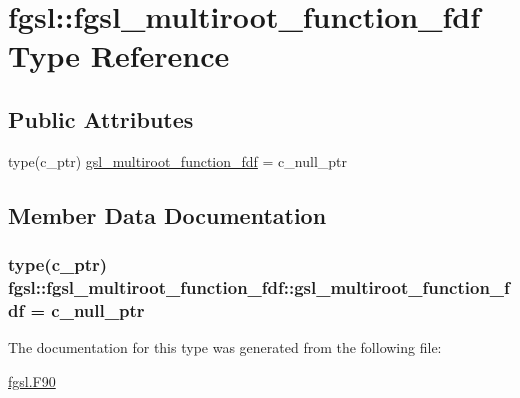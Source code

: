 \hypertarget{structfgsl_1_1fgsl__multiroot__function__fdf}{\section{fgsl\-:\-:fgsl\-\_\-multiroot\-\_\-function\-\_\-fdf Type Reference}
\label{structfgsl_1_1fgsl__multiroot__function__fdf}
}
\subsection*{Public Attributes}
\begin{DoxyCompactItemize}
\item 
type(c\-\_\-ptr) \hyperlink{structfgsl_1_1fgsl__multiroot__function__fdf_a7e4614c5bef5c785a7e73924069b5d75}{gsl\-\_\-multiroot\-\_\-function\-\_\-fdf} = c\-\_\-null\-\_\-ptr
\end{DoxyCompactItemize}


\subsection{Member Data Documentation}
\hypertarget{structfgsl_1_1fgsl__multiroot__function__fdf_a7e4614c5bef5c785a7e73924069b5d75}{
\subsubsection[{gsl\-\_\-multiroot\-\_\-function\-\_\-fdf}]{\setlength{\rightskip}{0pt plus 5cm}type(c\-\_\-ptr) fgsl\-::fgsl\-\_\-multiroot\-\_\-function\-\_\-fdf\-::gsl\-\_\-multiroot\-\_\-function\-\_\-fdf = c\-\_\-null\-\_\-ptr}}\label{structfgsl_1_1fgsl__multiroot__function__fdf_a7e4614c5bef5c785a7e73924069b5d75}


The documentation for this type was generated from the following file\-:\begin{DoxyCompactItemize}
\item 
\hyperlink{fgsl_8F90}{fgsl.\-F90}\end{DoxyCompactItemize}
